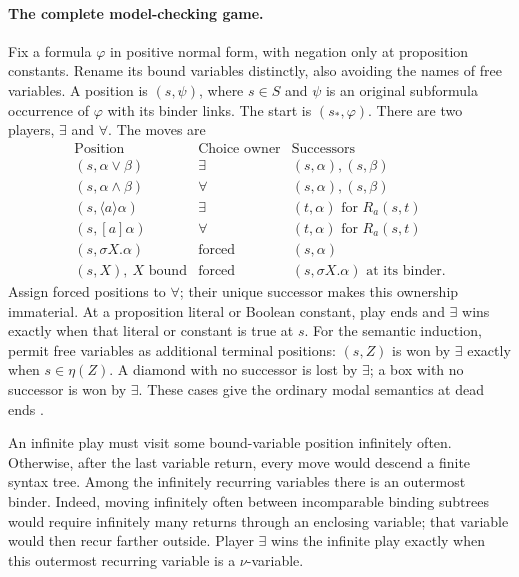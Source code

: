 \paragraph{The complete model-checking game.}
\label{sec:p09-mu-evaluation-game}
Fix a formula \(\varphi\) in positive normal form,
with negation only at proposition constants.
Rename its bound variables distinctly, also avoiding
the names of free variables. A position is
\((s,\psi)\), where \(s\in S\) and \(\psi\)
is an original subformula occurrence of \(\varphi\)
with its binder links. The start is \((s_*,\varphi)\).
There are two players, \(\exists\) and \(\forall\).
The moves are
\[
\begin{array}{lll}
 \text{Position}&\text{Choice owner}&\text{Successors}\\
 (s,\alpha\lor\beta)&\exists&(s,\alpha),(s,\beta)\\
 (s,\alpha\land\beta)&\forall&(s,\alpha),(s,\beta)\\
 (s,\langle a\rangle\alpha)&\exists&
                  (t,\alpha)\text{ for }R_a(s,t)\\
 (s,[a]\alpha)&\forall&
                  (t,\alpha)\text{ for }R_a(s,t)\\
 (s,\sigma X.\alpha)&\text{forced}&(s,\alpha)\\
 (s,X),\ X\text{ bound}&\text{forced}&
                  (s,\sigma X.\alpha)\text{ at its binder}.
\end{array}
\]
Assign forced positions to \(\forall\); their
unique successor makes this ownership immaterial.
At a proposition literal or Boolean constant,
play ends and \(\exists\) wins exactly when
that literal or constant is true at \(s\).
For the semantic induction, permit free variables
as additional terminal positions: \((s,Z)\) is
won by \(\exists\) exactly when \(s\in\eta(Z)\).
A diamond with no successor is lost by \(\exists\);
a box with no successor is won by \(\exists\).
These cases give the ordinary modal semantics
at dead ends \cite[\S4.4]{BradfieldStirling2007}.

An infinite play must visit some bound-variable
position infinitely often. Otherwise, after
the last variable return, every move would
descend a finite syntax tree. Among the
infinitely recurring variables there is an
outermost binder. Indeed, moving infinitely
often between incomparable binding subtrees
would require infinitely many returns through
an enclosing variable; that variable would
then recur farther outside.
Player \(\exists\) wins the infinite play
exactly when this outermost recurring variable
is a \(\nu\)-variable.

